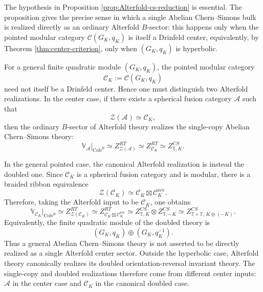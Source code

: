 \documentclass[12pt]{amsart}
\numberwithin{equation}{section}
\theoremstyle{definition}
\begin{document}
The hypothesis in Proposition \ref{prop:Alterfold-cs-reduction} is essential. The proposition gives the precise sense in which a single Abelian Chern--Simons bulk is realized directly as an ordinary Alterfold $B$-sector: this happens only when the pointed modular category $\mathcal C(G_K,q_K)$ is itself a Drinfeld center, equivalently, by Theorem \ref{thm:center-criterion}, only when $(G_K,q_K)$ is hyperbolic.

For a general finite quadratic module $(G_K,q_K)$, the pointed modular
category
$$
\mathcal C_K:=\mathcal C(G_K,q_K)
$$
need not itself be a Drinfeld center. Hence one must distinguish two
Alterfold realizations. In the center case, if there exists a spherical
fusion category $\mathcal A$ such that
$$
\mathcal Z(\mathcal A)\simeq \mathcal C_K,
$$
then the ordinary $B$-sector of Alterfold theory realizes the single-copy
Abelian Chern--Simons theory:
$$
\mathbb V_{\mathcal A}\big|_{\mathrm{Cob}^B}
\simeq
Z^{RT}_{\mathcal Z(\mathcal A)}
\simeq
Z^{RT}_{\mathcal C_K}
\simeq
Z^{CS}_{\mathbb T,K}.
$$

In the general pointed case, the canonical Alterfold realization is instead
the doubled one. Since $\mathcal C_K$ is a spherical fusion category and is
modular, there is a braided ribbon equivalence
$$
\mathcal Z(\mathcal C_K)
\simeq
\mathcal C_K\boxtimes \mathcal C_K^{\mathrm{rev}}.
$$
Therefore, taking the Alterfold input to be $\mathcal C_K$, one obtains
$$
\mathbb V_{\mathcal C_K}\big|_{\mathrm{Cob}^B}
\simeq
Z^{RT}_{\mathcal Z(\mathcal C_K)}
\simeq
Z^{RT}_{\mathcal C_K\boxtimes \mathcal C_K^{\mathrm{rev}}}
\simeq
Z^{CS}_{\mathbb T,K}\otimes Z^{CS}_{\mathbb T,-K}
\simeq
Z^{CS}_{\mathbb T\times\mathbb T,\,K\oplus(-K)}.
$$
Equivalently, the finite quadratic module of the doubled theory is
$$
(G_K,q_K)\oplus (G_K,q_K^{-1}).
$$
Thus a general Abelian Chern--Simons theory is not asserted to be directly realized as a single Alterfold center sector. Outside the hyperbolic case, Alterfold theory canonically realizes its doubled orientation-reversal invariant theory. The single-copy and doubled realizations therefore come from different center inputs: $\mathcal A$ in the center case and $\mathcal C_K$ in the canonical doubled case.
\end{document}
